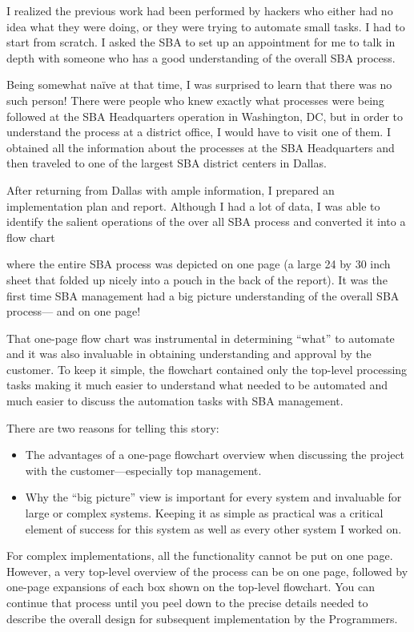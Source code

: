 \documentclass{book}
\begin{document}
\begin{multicols}{2}
I realized the previous work had been performed by hackers who either had no idea what
they were doing, or they were trying to automate
small tasks. I had to start from scratch. I asked
the SBA to set up an appointment for me to talk
in depth with someone who has a good understanding of the overall SBA process.

Being somewhat naïve at that time, I was
surprised to learn that there was no such person! There were people who knew exactly
what processes were being followed at the SBA
Headquarters operation in Washington, DC,
but in order to understand the process at a district office, I would have to visit one of them. I
obtained all the information about the processes
at the SBA Headquarters and then traveled to
one of the largest SBA district centers in Dallas.

After returning from Dallas with ample
information, I prepared an implementation plan
and report. Although I had a lot of data, I was
able to identify the salient operations of the over all SBA process and converted it into a flow chart




where the entire SBA process was depicted on one
page (a large 24 by 30 inch sheet that folded up
nicely into a pouch in the back of the report). It
was the first time SBA management had a big picture understanding of the overall SBA process—
and on one page!

That one-page flow chart was instrumental
in determining “what” to automate and it was
also invaluable in obtaining understanding and
approval by the customer. To keep it simple, the
flowchart contained only the top-level processing
tasks making it much easier to understand what
needed to be automated and much easier to discuss the automation tasks with SBA management.

There are two reasons for telling this story:
\begin{itemize}
\item The advantages of a one-page flowchart overview when
discussing the project with the customer—especially
top management.
\item Why the “big picture” view is important for every
system and invaluable for large or complex systems.
Keeping it as simple as practical was a critical element
of success for this system as well as every other system
I worked on.
\end{itemize}

For complex implementations, all the functionality cannot
be put on one page. However, a very top-level overview of the
process can be on one page, followed by one-page expansions
of each box shown on the top-level flowchart. You can continue
that process until you peel down to the precise details needed
to describe the overall design for subsequent implementation
by the Programmers.


\end{multicols}
\end{document}
